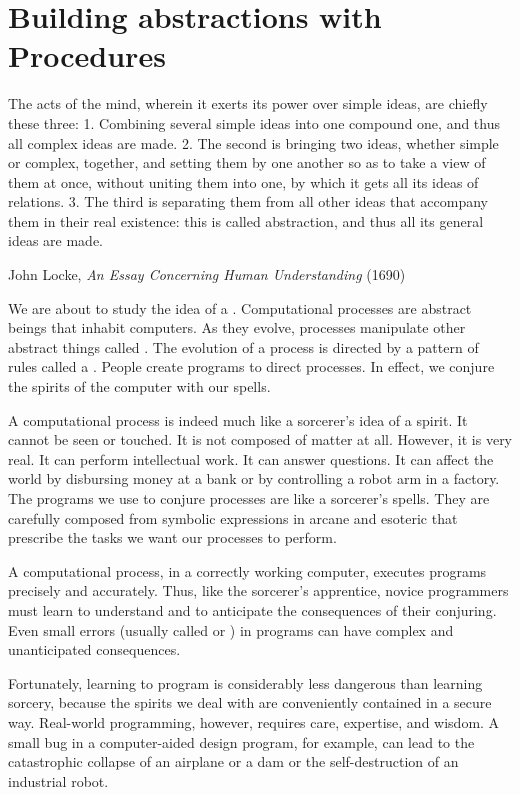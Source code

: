 \mainmatter
\chapter{Building abstractions with Procedures}
\label{chap-1}
\epigraph{The acts of the mind, wherein it exerts its power over simple ideas,
are chiefly these three: 1. Combining several simple ideas into one
compound one, and thus all complex ideas are made.  2. The second is
bringing two ideas, whether simple or complex, together, and setting
them by one another so as to take a view of them at once, without
uniting them into one, by which it gets all its ideas of relations.
3.  The third is separating them from all other ideas that accompany
them in their real existence: this is called abstraction, and thus all
its general ideas are made.}{John Locke, \textit{An Essay Concerning Human Understanding} (1690)}

We are about to study the idea of a .
Computational processes are abstract beings that inhabit computers.
As they evolve, processes manipulate other abstract things called
.  The evolution of a process is directed by a pattern of
rules called a .  People create programs to direct
processes.  In effect, we conjure the spirits of the computer with our
spells.

A computational process is indeed much like a sorcerer's idea of a
spirit.  It cannot be seen or touched.  It is not composed of matter
at all.  However, it is very real.  It can perform intellectual work.
It can answer questions.  It can affect the world by disbursing money
at a bank or by controlling a robot arm in a factory.  The programs we
use to conjure processes are like a sorcerer's spells.  They are
carefully composed from symbolic expressions in arcane and esoteric
 that prescribe the tasks we want our
processes to perform.

A computational process, in a correctly working computer, executes
programs precisely and accurately.  Thus, like the sorcerer's
apprentice, novice programmers must learn to understand and to
anticipate the consequences of their conjuring.  Even small errors
(usually called  or ) in programs can have
complex and unanticipated consequences.

Fortunately, learning to program is considerably less dangerous than
learning sorcery, because the spirits we deal with are conveniently
contained in a secure way.  Real-world programming, however,
requires care, expertise, and wisdom.  A small bug in a computer-aided
design program, for example, can lead to the catastrophic collapse of
an airplane or a dam or the self-destruction of an industrial robot.

